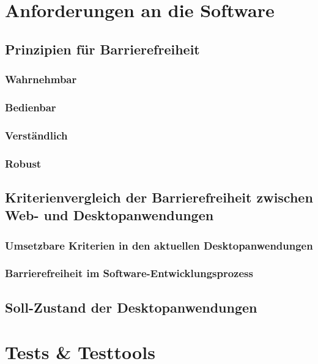 \section{Anforderungen an die Software}

\subsection{Prinzipien für Barrierefreiheit}
\label{subsec:Prinzipien fuer Barrierefreiheit}

\subsubsection{Wahrnehmbar}
\subsubsection{Bedienbar}
\subsubsection{Verständlich}
\subsubsection{Robust}

\subsection{Kriterienvergleich der Barrierefreiheit zwischen Web- und Desktopanwendungen}
\subsubsection{Umsetzbare Kriterien in den aktuellen Desktopanwendungen}
\subsubsection{Barrierefreiheit im Software-Entwicklungsprozess}

\subsection{Soll-Zustand der Desktopanwendungen}


\section{Tests \& Testtools}
